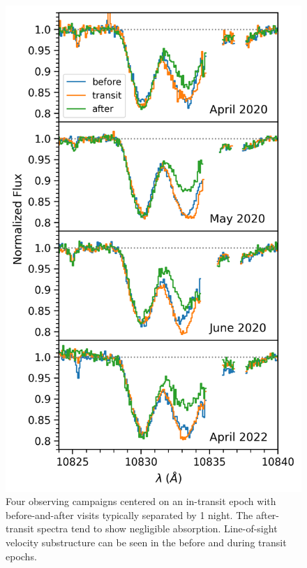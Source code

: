 \documentclass[linenumbers, twocolumn, trackchanges]{aastex631}
\begin{document}
\begin{figure}
  \includegraphics[width=\linewidth]{HAT_P_67b_byCampaign_Spectra.png}
  \caption{Four observing campaigns centered on an in-transit epoch with before-and-after visits typically separated by 1 night. The after-transit spectra tend to show negligible absorption.  Line-of-sight velocity substructure can be seen in the before and during transit epochs.}
  \label{fig:HPFperCampaign}
\end{figure}
\end{document}
